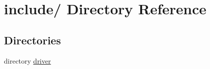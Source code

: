 \hypertarget{dir_000000}{
\section{include/ Directory Reference}
\label{dir_000000}
}
\subsection*{Directories}
\begin{CompactItemize}
\item 
directory \hyperlink{dir_000001}{driver}
\end{CompactItemize}
